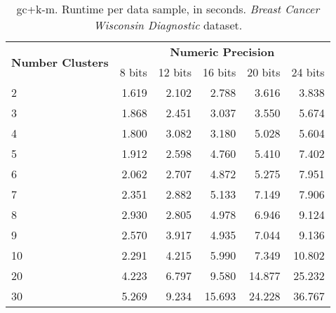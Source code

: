 \begin{table}[h]
\centering
\caption{\acs{gc}+\acs{k-m}. Runtime per data sample, in seconds. \emph{Breast Cancer Wisconsin Diagnostic} dataset.}
\label{table:runtimeKMBCW}
\vspace*{0.2cm}
\begin{tabular}{|l|r|r|r|r|r|}
\hline
\multirow{2}{*}{\textbf{Number Clusters}} & \multicolumn{5}{c|}{\textbf{Numeric Precision}}                                             \\ \cline{2-6} 
                                          & 8 bits & 12 bits & 16 bits & 20 bits & 24 bits \\ \hline
2                                & 1.619           & 2.102            & 2.788            & 3.616            & 3.838            \\ \hline
3                                & 1.868           & 2.451            & 3.037            & 3.550            & 5.674            \\ \hline
4                                & 1.800           & 3.082            & 3.180            & 5.028            & 5.604            \\ \hline
5                                & 1.912           & 2.598            & 4.760            & 5.410            & 7.402            \\ \hline
6                                & 2.062           & 2.707            & 4.872            & 5.275            & 7.951            \\ \hline
7                                & 2.351           & 2.882            & 5.133            & 7.149            & 7.906            \\ \hline
8                                & 2.930           & 2.805            & 4.978            & 6.946            & 9.124            \\ \hline
9                                & 2.570           & 3.917            & 4.935            & 7.044            & 9.136            \\ \hline
10                               & 2.291           & 4.215            & 5.990            & 7.349            & 10.802           \\ \hline
20                               & 4.223           & 6.797            & 9.580            & 14.877           & 25.232           \\ \hline
30                               & 5.269           & 9.234            & 15.693           & 24.228           & 36.767           \\ \hline

\end{tabular}
\end{table}
